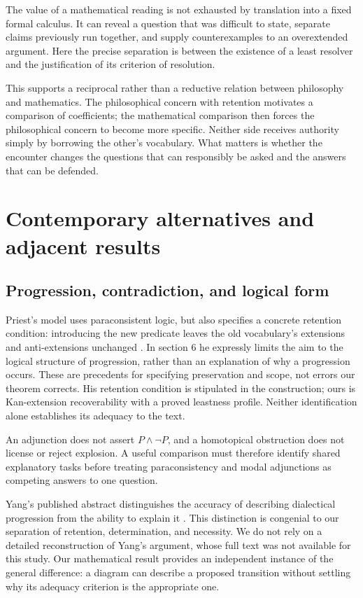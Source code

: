 The value of a mathematical reading is not exhausted by translation into a
fixed formal calculus. It can reveal a question that was difficult to state,
separate claims previously run together, and supply counterexamples to an
overextended argument. Here the precise separation is between the
existence of a least resolver and the justification of its criterion of
resolution.

This supports a reciprocal rather than a reductive relation between
philosophy and mathematics. The philosophical concern with retention
motivates a comparison of coefficients; the mathematical comparison then
forces the philosophical concern to become more specific. Neither side
receives authority simply by borrowing the other's vocabulary. What matters
is whether the encounter changes the questions that can responsibly be
asked and the answers that can be defended.

\section{Contemporary alternatives and adjacent results}
\label{sec:literature}

\subsection{Progression, contradiction, and logical form}

Priest's model uses paraconsistent logic, but also specifies a concrete
retention condition: introducing the new predicate leaves the old
vocabulary's extensions and anti-extensions unchanged
\cite[section 3]{Priest}. In section 6 he expressly limits the aim to the
logical structure of progression, rather than an explanation of why a
progression occurs. These are precedents for specifying preservation and
scope, not errors our theorem corrects. His retention condition is
stipulated in the construction; ours is Kan-extension recoverability
with a proved leastness profile. Neither identification alone establishes
its adequacy to the text.

An adjunction does not assert $P\wedge\neg P$, and a homotopical
obstruction does not license or reject explosion. A useful comparison
must therefore identify shared explanatory tasks before treating
paraconsistency and modal adjunctions as competing answers to one
question.

Yang's published abstract distinguishes the accuracy of describing
dialectical progression from the ability to explain it \cite{Yang}.
This distinction is congenial to our separation of retention,
determination, and necessity. We do not rely on a detailed reconstruction
of Yang's argument, whose full text was not available for this study.
Our mathematical result provides an independent instance of the general
difference: a diagram can describe a proposed transition without
settling why its adequacy criterion is the appropriate one.

